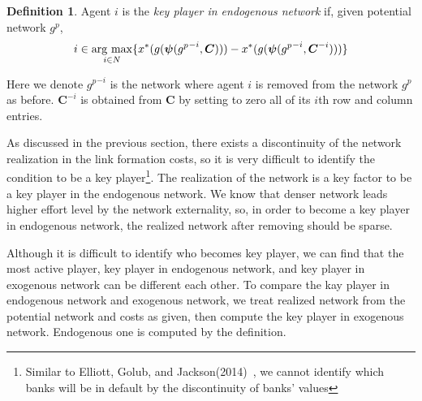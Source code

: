 \documentclass[12pt]{article}
\theoremstyle{definition}
\newtheorem{definition}{Definition}
\newcommand{\bm}[1]{\boldsymbol{#1}}
\newcommand{\argmax}{\mathop{\rm arg~max}\limits}
\begin{document}
\begin{definition}
Agent $i$ is the {\it{key player in endogenous network}} if, given potential network $g^p$,
\[ i \in \argmax_{i \in N} \{ x^*(g(\bm{\psi}({g^p}^{-i}, \bm{C}))) - x^*(g(\bm{\psi}({g^p}^{-i}, \bm{C}^{-i}))) \} \]
\end{definition}
Here we denote ${g^p}^{-i}$ is the network where agent $i$ is removed from the network $g^p$ as before.
$\bm{C}^{-i}$ is obtained from $\bm{C}$ by setting to zero all of its $i$th row and column entries.

As discussed in the previous section, there exists a discontinuity of the network realization in the link formation costs, so it is very difficult to identify the condition to be a key player\footnote{Similar to Elliott, Golub, and Jackson(2014)~\cite{contagion}, we cannot identify which banks will be in default by the discontinuity of banks' values}.
The realization of the network is a key factor to be a key player in the endogenous network.
We know that denser network leads higher effort level by the network externality, so, in order to become a key player in endogenous network, the realized network after removing should be sparse.

Although it is difficult to identify who becomes key player, we can find that the most active player, key player in endogenous network, and key player in exogenous network can be different each other.
To compare the kay player in endogenous network and exogenous network, we treat realized network from the potential network and costs as given, then compute the key player in exogenous network.
Endogenous one is computed by the definition.
\end{document}
